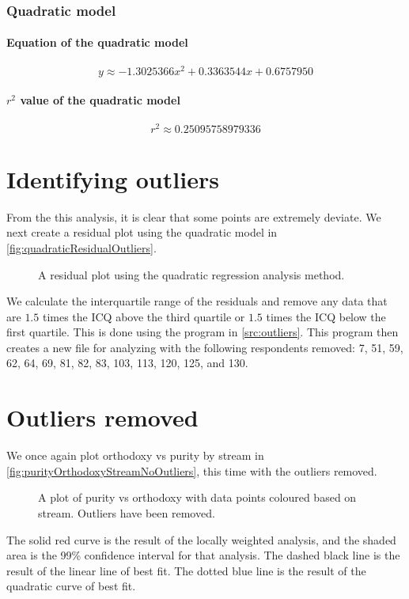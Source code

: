 \subsubsection{Quadratic model}
\paragraph{Equation of the quadratic model}
\[y \approx -1.3025366x^2 + 0.3363544x + 0.6757950\]
\paragraph{$r^2$ value of the quadratic model}
\[r^2 \approx 0.25095758979336\]

\section{Identifying outliers}
From the this analysis, it is clear that some points are extremely deviate.
We next create a residual plot using the quadratic model in \vref{fig:quadraticResidualOutliers}.

\begin{figure}[H]
	\caption{A residual plot using the quadratic regression analysis method.}
	\label{fig:quadraticResidualOutliers}
\end{figure}

We calculate the interquartile range of the residuals and remove any data that are $1.5$ times the ICQ above the third quartile or $1.5$ times the ICQ below the first quartile.
This is done using the program in \vref{src:outliers}.
This program then creates a new file for analyzing with the following respondents removed: 7, 51, 59, 62, 64, 69, 81, 82, 83, 103, 113, 120, 125, and 130.

\section{Outliers removed}
We once again plot orthodoxy vs purity by stream in \vref{fig:purityOrthodoxyStreamNoOutliers}, this time with the outliers removed.
\begin{figure}[H]
	\caption{A plot of purity vs orthodoxy with data points coloured based on stream. Outliers have been removed.}
	\label{fig:purityOrthodoxyStreamNoOutliers}
\end{figure}
The solid red curve is the result of the locally weighted analysis, and the shaded area is the 99\% confidence interval for that analysis.
The dashed black line is the result of the linear line of best fit.
The dotted blue line is the result of the quadratic curve of best fit.

